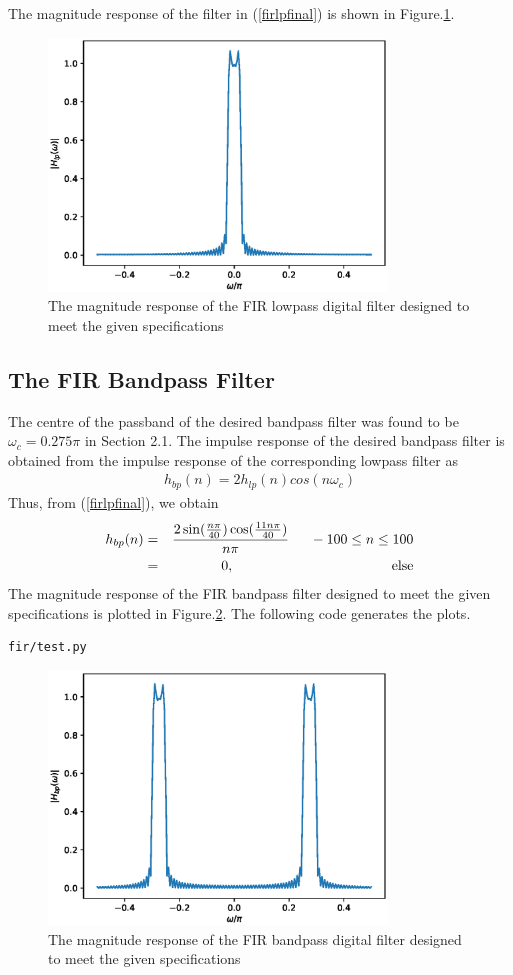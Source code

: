 \documentclass[journal,12pt,twocolumn]{IEEEtran}
\begin{document}
The magnitude  response of the filter in (\ref{firlpfinal}) is shown in Figure.\ref{fig:fir_lowpass}.
\begin{figure}[!ht]
    \centering
    \includegraphics[width = 9cm]{./figs/fir/lowpass.eps}
    \caption{The magnitude response of the FIR lowpass digital filter designed to meet the given specifications} 
    \label{fig:fir_lowpass}
\end{figure}
\subsection{The FIR Bandpass Filter}
The centre of the passband of the desired bandpass filter was found to be $\omega_c = 0.275\pi$ in Section
2.1.  The impulse response of the desired bandpass filter is obtained from the impulse response of the
corresponding lowpass filter as
\begin{eqnarray}
h_{bp}(n) = 2h_{lp}(n)cos(n\omega_c)
\end{eqnarray}
Thus, from (\ref{firlpfinal}), we obtain
\begin{eqnarray}
\label{firbpfinal}
h_{bp}(n) &=& \frac{2\sin(\frac{n\pi}{40}) \cos(\frac{11n\pi}{40})}{n\pi} \indent -100 \leq n \leq 100 \nonumber \\
&=& 0, \hspace{4cm} \mbox{else}
\end{eqnarray}
%
The magnitude response of the FIR bandpass filter designed to meet the given specifications is plotted in Figure.\ref{fig:fir_bandpass}.
The following code generates the plots.
\begin{lstlisting}
fir/test.py
\end{lstlisting}
\begin{figure}[!ht]
    \centering
    \includegraphics[width = 9cm]{./figs/fir/bandpass.eps}
    \caption{The magnitude response of the FIR bandpass digital filter designed to meet the given specifications}
    \label{fig:fir_bandpass}
\end{figure}
\end{document}

